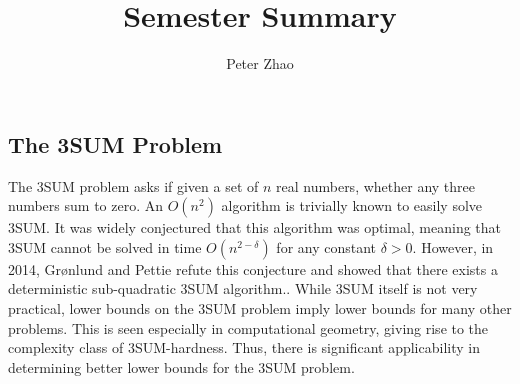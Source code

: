 \documentclass[12pt]{article}
\begin{document}
 
 
 
\title{\vspace{-2cm}Semester Summary}%
\author{Peter Zhao} 
\date{\vspace{-1cm}}
\maketitle

\subsection*{The 3SUM Problem}
The 3SUM problem asks if given a set of $n$ real numbers, whether any three numbers sum to zero. An $O(n^2)$ algorithm is trivially known to easily solve 3SUM. It was widely conjectured that this algorithm was optimal, meaning that 3SUM cannot be solved in time $O(n^{2-\delta})$ for any constant $\delta > 0$. However, in 2014, Grønlund and Pettie refute this conjecture and showed that there exists a deterministic sub-quadratic 3SUM algorithm.. While 3SUM itself is not very practical, lower bounds on the 3SUM problem imply lower bounds for many other problems. This is seen especially in computational geometry, giving rise to the complexity class of 3SUM-hardness. Thus, there is significant applicability in determining better lower bounds for the 3SUM problem.
\end{document}
